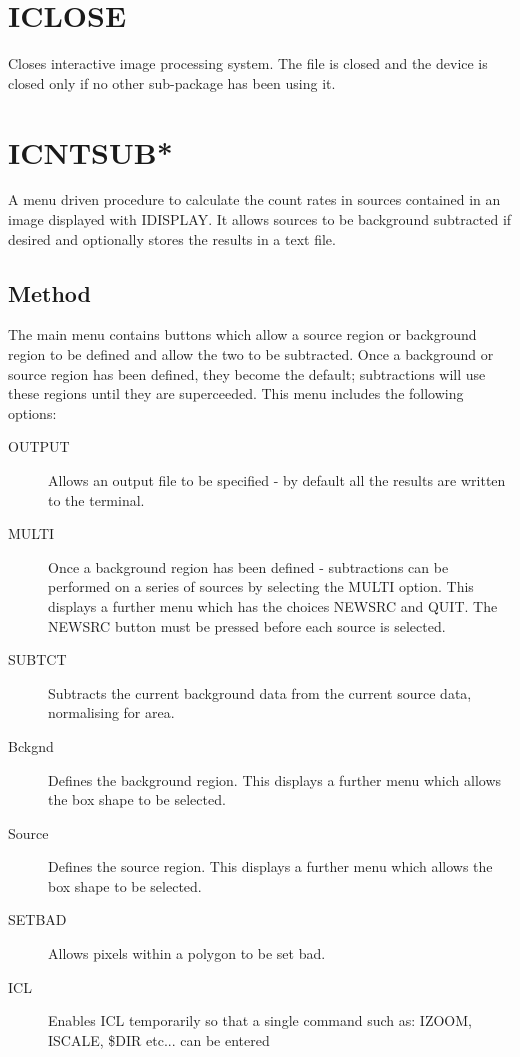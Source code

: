 \documentclass{book}
\renewcommand{\_}{{\tt\char'137}}     %
\begin{document}
\section{ICLOSE}
Closes interactive image processing system. The file is closed
and the device is closed only if no other sub-package has been
using it.

\section{ICNTSUB*}
A menu driven procedure to calculate the count rates in sources
contained in an image displayed with IDISPLAY. It allows sources
to be background subtracted if desired and optionally stores the
results in a text file.

\subsection{Method}
The main menu contains buttons which allow a source region or
background region to be defined and allow the two to be subtracted.
Once a background or source region has been defined, they become
the default; subtractions will use these regions until they are
superceeded. This menu includes the following options:


\begin{description}
\item[OUTPUT]
Allows an output file to be specified - by default all
the results are written to the terminal.
\item[MULTI]
Once a background region has been defined - subtractions
can be performed on a series of sources by selecting the
MULTI option. This displays a further menu which has the
choices NEWSRC and QUIT. The NEWSRC button must be pressed
before each source is selected.
\item[SUBTCT]
Subtracts the current background data from the current
source data, normalising for area.
\item[Bckgnd]
Defines the background region. This displays a further menu
which allows the box shape to be selected.
\item[Source]
Defines the source region. This displays a further menu
which allows the box shape to be selected.
\item[SETBAD]
Allows pixels within a polygon to be set bad.
\item[ICL]
Enables ICL temporarily so that a single command such as:
IZOOM, ISCALE, \$DIR etc... can be entered
\end{description}
\end{document}
